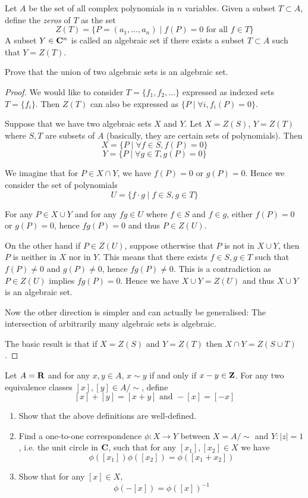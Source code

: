 \begin{prbm}
Let $A$ be the set of all complex polynomials in $n$ variables. Given a subset $T \subset A$, define the \textit{zeros} of $T$ as the set
\[ Z(T) = \{P=(a_1,\dots,a_n) \mid f(P)=0 \text{ for all } f \in T\} \]
A subset $Y \in \mathbf C^n$ is called an algebraic set if there exists a subset $T \subset A$ such that $Y=Z(T)$.

Prove that the union of two algebraic sets is an algebraic set.
\end{prbm}
\begin{proof}
We would like to consider $T=\{f_1, f_2, \dots\}$ expressed as indexed sets $T=\{f_i\}$. Then $Z(T)$ can also be expressed as $\{P \mid \forall i, f_i(P)=0\}$.

Suppose that we have two algebraic sets $X$ and $Y$. Let $X=Z(S)$, $Y=Z(T)$ where $S,T$ are subsets of $A$ (basically, they are certain sets of polynomials). Then
\[ X=\{P \mid \forall f \in S, f(P)=0\} \]
\[ Y=\{P \mid \forall g \in T, g(P)=0\} \]

We imagine that for $P\in X\cap Y$, we have $f(P)=0$ or $g(P)=0$. Hence we consider the set of polynomials
\[ U=\{f\cdot g \mid f\in S, g\in T\} \]

For any $P\in X\cup Y$ and for any $fg\in U$ where $f\in S$ and $f\in g$, either $f(P)=0$ or $g(P)=0$, hence $fg(P)=0$ and thus $P\in Z(U)$.

On the other hand if $P\in Z(U)$, suppose otherwise that $P$ is not in $X\cup Y$, then $P$ is neither in $X$ nor in $Y$. This means that there exists $f\in S,g\in T$ such that $f(P)\neq0$ and $g(P)\neq0$, hence $fg(P)\neq0$. This is a contradiction as $P\in Z(U)$ implies $fg(P)=0$. Hence we have $X\cup Y=Z(U)$ and thus $X\cup Y$ is an algebraic set.

Now the other direction is simpler and can actually be generalised: The intersection of arbitrarily many algebraic sets is algebraic. 

The basic result is that if $X=Z(S)$ and $Y=Z(T)$ then $X\cap Y=Z(S\cup T)$. 
\end{proof}
\pagebreak

\begin{prbm}
Let $A = \mathbf R$ and for any $x, y \in A$, $x \sim y$ if and only if $x-y \in \mathbf Z$. For any two equivalence classes $[x], [y] \in A/\sim$, define
\[ [x] + [y] = [x + y] \text{ and } -[x] = [-x] \]
\begin{enumerate}[label=(\alph*)]
\item Show that the above definitions are well-defined.
\item Find a one-to-one correspondence $\phi:X \to Y$ between $X = A/\sim$ and $Y:|z| = 1$, i.e. the unit circle in $\mathbf C$, such that for any $[x_1], [x_2] \in X$ we have
\[ \phi([x_1])\phi([x_2]) = \phi([x_1 + x_2]) \]
\item Show that for any $[x] \in X$,
\[ \phi(-[x]) = \phi([x])^{-1} \]
\end{enumerate}
\end{prbm}

